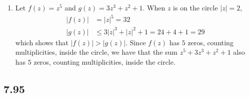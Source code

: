 \documentclass[a4paper,12pt]{article}
\begin{document}
\begin{enumerate}
\begin{enumerate}
            \item
                Let $f(z) = z^5$ and $g(z) = 3z^3 + z^2 + 1$. When $z$ is on the circle $|z| = 2$,
                \begin{align*}
                    |f(z)| &= |z|^5 = 32 \\
                    |g(z)| &\leq 3|z|^3 + |z|^2 + 1 = 24 + 4 + 1 = 29
                \end{align*}
                which shows that $|f(z)| > |g(z)|$. Since $f(z)$ has $5$ zeros, counting multiplicities, inside the circle, we have that the sum $z^5 + 3z^3 + z^2 + 1$ also has $5$ zeros, counting multiplicities, inside the circle.
        \end{enumerate}
\end{enumerate}

\subsection*{7.95}
\end{document}
